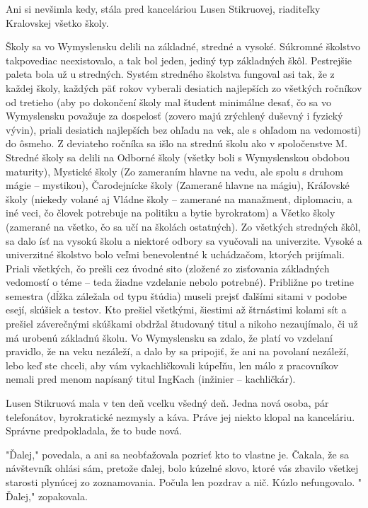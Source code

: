 \documentclass{book}
\begin{document}
Ani si nevšimla kedy, stála pred kanceláriou Lusen Stikruovej, riaditeľky Kralovskej všetko školy.

Školy sa vo Wymyslensku delili na základné, stredné a vysoké. Súkromné školstvo takpovediac neexistovalo, a tak bol jeden, jediný typ základných škôl. Pestrejšie paleta bola už u stredných. Systém stredného školstva fungoval asi tak, že z každej školy, každých päť rokov vyberali desiatich najlepších zo všetkých ročníkov od tretieho (aby po dokončení školy mal študent minimálne desať, čo sa vo Wymyslensku považuje za dospelosť (zovero majú zrýchlený duševný i fyzický vývin), priali desiatich najlepších bez ohľadu na vek, ale s ohľadom na vedomosti) do ôsmeho. Z deviateho ročníka sa išlo na strednú školu ako v spoločenstve M. Stredné školy sa delili na Odborné školy (všetky boli s Wymyslenskou obdobou maturity), Mystické školy (Zo zameraním hlavne na vedu, ale spolu s druhom mágie – mystikou), Čarodejnícke školy (Zamerané hlavne na mágiu), Kráľovské školy (niekedy volané aj Vládne školy – zamerané na manažment, diplomaciu, a iné veci, čo človek potrebuje na politiku a bytie byrokratom) a Všetko školy (zamerané na všetko, čo sa učí na školách ostatných). Zo všetkých stredných škôl, sa dalo ísť na vysokú školu a niektoré odbory sa vyučovali na univerzite. Vysoké a univerzitné školstvo bolo veľmi benevolentné k uchádzačom, ktorých prijímali. Priali všetkých, čo prešli cez úvodné sito (zložené zo zisťovania základných vedomostí o téme – teda žiadne vzdelanie nebolo potrebné). Približne po tretine semestra (dĺžka záležala od typu štúdia) museli prejsť ďalšími sitami v podobe esejí, skúšiek a testov. Kto prešiel všetkými, šiestimi až štrnástimi kolami sít a prešiel záverečnými skúškami obdržal študovaný titul a nikoho nezaujímalo, či už má urobenú základnú školu. Vo Wymyslensku sa zdalo, že platí vo vzdelaní pravidlo, že na veku nezáleží, a dalo by sa pripojiť, že ani na povolaní nezáleží, lebo keď ste chceli, aby vám vykachličkovali kúpeľňu, len málo z pracovníkov nemali pred menom napísaný titul IngKach (inžinier – kachličkár).

Lusen Stikruová mala v ten deň vcelku všedný deň. Jedna nová osoba, pár telefonátov, byrokratické nezmysly a káva. Práve jej niekto klopal na kanceláriu. Správne predpokladala, že to bude nová.

"$ $Ďalej,"$ $ povedala, a ani sa neobťažovala pozrieť kto to vlastne je. Čakala, že sa návštevník ohlási sám, pretože ďalej, bolo kúzelné slovo, ktoré vás zbavilo všetkej starosti plynúcej zo zoznamovania. Počula len pozdrav a nič. Kúzlo nefungovalo. "$ $Ďalej,"$ $ zopakovala.
\end{document}
